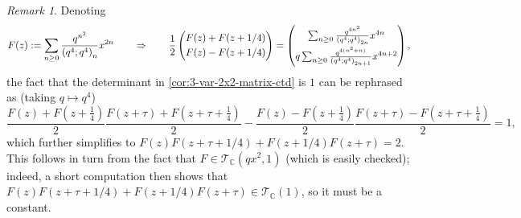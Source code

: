 \documentclass[reqno,11pt]{amsart}
\theoremstyle{definition}
\theoremstyle{remark}
\newtheorem*{remark}{Remark}
\numberwithin{equation}{section}
\newcommand{\C}{\mathbb{C}}
\newcommand{\mT}{\mathcal{T}}
\begin{document}
\begin{remark}
Denoting
\[
    F(z) := 
    \sum_{n \ge 0} \frac{q^{n^2}}{\left(q^4; q^4\right)_n} x^{2n}
    \qquad
    \Rightarrow 
    \qquad 
    \frac{1}{2}
    \begin{pmatrix}
    F(z) + F(z+1/4) \vspace{0.1cm} \\
    F(z) - F(z+1/4)
    \end{pmatrix}
    =
    \begin{pmatrix}
    \sum_{n \ge 0} \frac{q^{4n^2}}{\left(q^4; q^4\right)_{2n}} x^{4n}
    \vspace{0.1cm} \\
    q\sum_{n \ge 0} \frac{q^{4(n^2+n)}}{\left(q^4; q^4\right)_{2n+1}} x^{4n+2}
    \end{pmatrix},
\]
the fact that the determinant in \cref{cor:3-var-2x2-matrix-ctd} is $1$ can be rephrased as (taking $q \mapsto q^4$)
\[
    \frac{F(z) + F\left(z + \frac{1}{4}\right)}{2}
    \frac{F\left(z + \tau\right) + F\left(z + \tau + \frac{1}{4}\right)}{2}
    -
    \frac{F(z) - F\left(z + \frac{1}{4}\right)}{2}
    \frac{F\left(z + \tau\right) - F\left(z + \tau + \frac{1}{4}\right)}{2}
    = 
    1,
\]
which further simplifies to $F(z)F(z + \tau + 1/4) + F(z + 1/4)F(z + \tau) = 2$. This follows in turn from the fact that $F \in \mT_\C\left(qx^2, 1\right)$ (which is easily checked); indeed, a short computation then shows that $F(z)F(z + \tau + 1/4) + F(z + 1/4)F(z + \tau) \in \mT_\C(1)$, so it must be a constant.
\end{remark}
\end{document}

